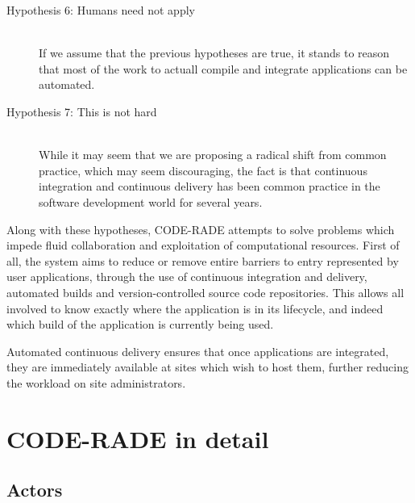 \documentclass[a4paper]{jpconf}
\begin{document}
\begin{description}
        \item[Hypothesis 6: Humans need not apply] \hfill \\%
        If we assume that the previous hypotheses are true, it stands to reason that most of the
            work to actuall compile and integrate applications can be automated. %
		\item[Hypothesis 7: This is not hard] \hfill \\
        While it may seem that we are proposing a radical shift from common practice, which may seem
            discouraging, the fact is that continuous integration\cite{ContinuousIntegration} and
            continuous delivery\cite{ContinuousDelivery} has been common practice in the software
            development world for several years.
	\end{description}

    Along with these hypotheses, CODE-RADE attempts  to solve problems which impede fluid
    collaboration and exploitation of computational resources. First of all, the system aims to
    reduce or remove entire barriers to entry represented by user applications, through the use of
    continuous integration and delivery, automated builds and version-controlled source code
    repositories. This allows all involved to know exactly where the application is in its
    lifecycle, and indeed which build of the application is currently being used.

    Automated continuous delivery ensures that once applications are integrated, they are
    immediately available at sites which wish to host them, further reducing the workload on site
    administrators.

	\section{CODE-RADE in detail}

	\subsection{Actors}
\end{document}
